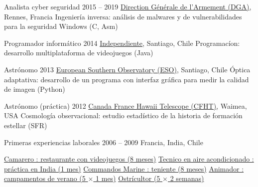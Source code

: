 \begin{joblist}[12.8][8.4][4]

\setlength{\parskip}{0.3cm}
\vspace{-0.4cm}

\item[Analista cyber seguridad]{2015 -- 2019}
	{
  \href{http://www.defense.gouv.fr/dga/}{Direction Générale de l'Armement (DGA)}, Rennes, Francia
	}
  {Ingeniería inversa: análisis de malwares y de vulnerabilidades para la seguridad Windows (C, Asm)}


\item[Programador informático]{2014}
	{
	\href{https://tinmarino.github.io/Page/}{Independiente}, Santiago, Chile
	}
	{Programacíon: desarrollo multiplataforma de videojuegos (Java)}



\item[Astrónomo]{2013}
	{
	\href{http://www.eso.org/public/}{European Southern Observatory (ESO)}, Santiago, Chile
	}
  {Óptica adaptativa: desarrollo de un programa con interfaz gráfica para medir la calidad de imagen (Python)}

\item[Astrónomo (práctica)]{2012}
	{
\href{https://www.cfht.hawaii.edu/}{Canada France Hawaii Telescope (CFHT)}, Waimea, USA
  }
  {Cosmología observacional: estudio estadístico de la historia de formación estellar (SFR)}
	
\item[Primeras experiencias laborales]{2006 -- 2009}
	{
	Francia, India, Chile
	}
	{
    \renewcommand\labelitemi{{}}
		\vspace{-0.8cm}
    \setlength{\parskip}{0cm}
		\begin{itemize}
		\setlength\itemsep{0cm}

    \cvitem \href{http://www.insertcoin.cl/}{ Camarero : restaurante con videojuegos (8 meses)}
    \cvitem \href{http://www.dupont.co.in/}{ Tecnico en aire acondicionado : práctica en India (1 mes)}
    \cvitem \href{http://www.defense.gouv.fr/marine/organisation/forces/fusiliers-marins-et-commandos/force-maritime-des-fusiliers-marins-et-commandos}{ Commandos Marine : teniente (8 meses)}
    \cvitem \href{http://www.vacances-pour-tous.org/}{ Animador : campamentos de verano (5 $\times$ 1 mes)}
    \cvitem \href{http://huitresdesaintvaast.fr/}{ Ostrícultor (5 $\times$ 2 semanas)}
		\end{itemize}
  }

	
\end{joblist}


